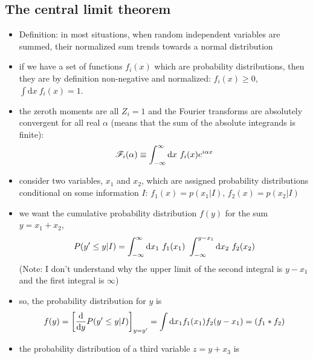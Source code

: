 \documentclass[../jaynes_prob_theory_notes.tex]{subfiles}
\begin{document}
        \subsection{The central limit theorem}
            \begin{itemize}
                \item Definition: in most situations, when random independent variables are summed, their normalized sum trends towards a normal distribution
                \item if we have a set of functions $f_{i}(x)$ which are probability distributions, then they are by definition non-negative and normalized: $f_{i}(x) \geq 0$, $\int \mathrm{d}x~f_{i}(x) =1$.
                \item the zeroth moments are all $Z_i = 1$ and the Fourier transforms are absolutely convergent for all real $\alpha$ (means that the sum of the absolute integrands is finite):
                    \begin{equation*}
                        \mathscr{F}_{i}(\alpha) \equiv \int^{\infty}_{-\infty} \mathrm{d}x~f_{i}(x) {e}^{i{\alpha}x}
                    \end{equation*}
                \item consider two variables, $x_1$ and $x_2$, which are assigned probability distributions conditional on some information $I$: $f_{1}(x) = p(x_{1}|I)$, $f_{2}(x) = p(x_{2}|I)$
                \item we want the cumulative probability distribution $f(y)$ for the sum $y = x_1 + x_2$,
                    \begin{equation*}
                        P(y' \leq y|I) = \int^{\infty}_{-\infty} \mathrm{d}x_{1}~f_{1}(x_1)~\int^{y-x_1}_{-\infty} \mathrm{d}x_{2}~f_{2}(x_2)
                    \end{equation*}
                    (Note: I don't understand why the upper limit of the second integral is $y-x_1$ and the first integral is $\infty$)
                \item so, the probability distribution for $y$ is
                    \begin{equation*}
                        f(y) = {\left[ \frac{\mathrm{d}}{\mathrm{d} y} P(y' \leq y|I) \right]}_{y=y'} = \int \mathrm{d}x_{1}f_{1}(x_1)f_{2}(y-x_1) = (f_1 * f_2)
                    \end{equation*}
                \item the probability distribution of a third variable $z = y + x_3$ is
                    \begin{equation*}

\end{equation*}
\end{itemize}
\end{document}
